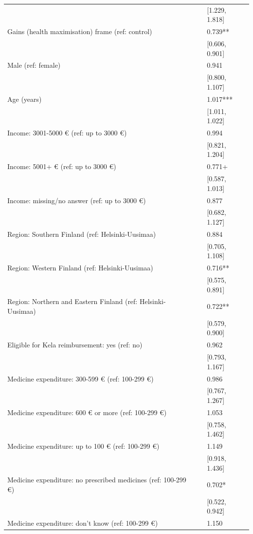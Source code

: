 \begin{tabular}{lll}
&  & [\num{1.229}, \num{1.818}] \\
Gains (health maximisation) frame (ref: control) &  & \num{0.739}** \\
&  & [\num{0.606}, \num{0.901}] \\
Male (ref: female) &  & \num{0.941} \\
&  & [\num{0.800}, \num{1.107}] \\
Age (years) &  & \num{1.017}*** \\
&  & [\num{1.011}, \num{1.022}] \\
Income: 3001-5000 € (ref: up to 3000 €) &  & \num{0.994} \\
&  & [\num{0.821}, \num{1.204}] \\
Income: 5001+ € (ref: up to 3000 €) &  & \num{0.771}+ \\
&  & [\num{0.587}, \num{1.013}] \\
Income: missing/no answer (ref: up to 3000 €) &  & \num{0.877} \\
&  & [\num{0.682}, \num{1.127}] \\
Region: Southern Finland (ref: Helsinki-Uusimaa) &  & \num{0.884} \\
&  & [\num{0.705}, \num{1.108}] \\
Region: Western Finland (ref: Helsinki-Uusimaa) &  & \num{0.716}** \\
&  & [\num{0.575}, \num{0.891}] \\
Region: Northern and Eastern Finland (ref: Helsinki-Uusimaa) &  & \num{0.722}** \\
&  & [\num{0.579}, \num{0.900}] \\
Eligible for Kela reimbursement: yes (ref: no) &  & \num{0.962} \\
&  & [\num{0.793}, \num{1.167}] \\
Medicine expenditure: 300-599 € (ref: 100-299 €) &  & \num{0.986} \\
&  & [\num{0.767}, \num{1.267}] \\
Medicine expenditure: 600 € or more (ref: 100-299 €) &  & \num{1.053} \\
&  & [\num{0.758}, \num{1.462}] \\
Medicine expenditure: up to 100 € (ref: 100-299 €) &  & \num{1.149} \\
&  & [\num{0.918}, \num{1.436}] \\
Medicine expenditure: no prescribed medicines (ref: 100-299 €) &  & \num{0.702}* \\
&  & [\num{0.522}, \num{0.942}] \\
Medicine expenditure: don't know (ref: 100-299 €) &  & \num{1.150} \\

\end{tabular}
